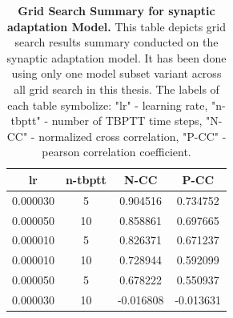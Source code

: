 \begin{table}
    \centering\footnotesize\sf
    \begin{tabular}{cccc}
    \toprule
    lr & n-tbptt & N-CC & P-CC \\
    \midrule
    0.000030 & 5 & 0.904516 & 0.734752 \\
    0.000050 & 10 & 0.858861 & 0.697665 \\
    0.000010 & 5 & 0.826371 & 0.671237 \\
    0.000010 & 10 & 0.728944 & 0.592099 \\
    0.000050 & 5 & 0.678222 & 0.550937 \\
    0.000030 & 10 & -0.016808 & -0.013631 \\
    \bottomrule
    \end{tabular}
    \caption{\textbf{Grid Search Summary for synaptic adaptation Model.} This table depicts grid search results summary conducted on the synaptic adaptation model. It has been done using only one model subset variant across all grid search in this thesis. The labels of each table symbolize: "lr" - learning rate, "n-tbptt" - number of TBPTT time steps, "N-CC" - normalized cross correlation, "P-CC" - pearson correlation coefficient.}
    \label{tab:grid_synaptic_adaptation}
\end{table}


